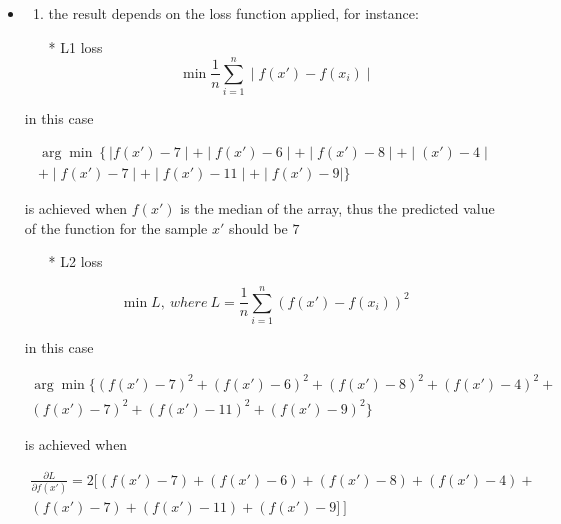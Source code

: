 \documentclass[11pt]{article}
\providecommand{\tightlist}{%
      \setlength{\itemsep}{0pt}\setlength{\parskip}{0pt}}
\begin{document}
    \begin{itemize}
\item
  \begin{enumerate}
  \def\labelenumi{(\alph{enumi})}
  \setcounter{enumi}{1}
  \tightlist
  \item
    the result depends on the loss function applied, for instance:
  \end{enumerate}

  \begin{itemize}
  \tightlist
  \item[*]
    L1 loss \[\min \frac{1}{n} \sum^n_{i=1} \mid f(x') - f(x_i) \mid\]
  \end{itemize}

  in this case

\begin{equation*}
	\begin{aligned}
		\arg \min \left \{\mid f(x') - 7 \mid + \mid f(x') - 6 \mid +\mid f(x') - 8 \mid+\mid (x') - 4 \mid \\
		+\mid f(x') - 7 \mid +\mid f(x') - 11 \mid+\mid f(x') - 9 \mid  \} 
	\end{aligned}
\end{equation*}


  is achieved when  \(f(x')\) is the median of the array, thus the predicted value of the function for the sample \(x'\) should
  be \(7\)

  \begin{itemize}
  \tightlist
  \item[*]
    L2 loss
  \end{itemize}

  \[\min L , \: where \: L = \frac{1}{n} \sum^n_{i=1} \left ( f(x') - f(x_i) \right )^2\]

  in this case

\begin{equation*}
	\begin{aligned}
	\arg \min  \{\left ( f(x') - 7\right )^2+ \left ( f(x') - 6 \right )^2+ \left ( f(x') - 8 \right )^2+ \left ( f(x') - 4 \right )^2+\\ \left ( f(x') - 7 \right )^2+ \left ( f(x') - 11 \right )^2+ \left ( f(x') -9 \right )^2 \}
	\end{aligned}
\end{equation*}

  is achieved when

 \begin{equation*}\label{eq:}
 \begin{aligned}
 \frac{\partial L}{\partial f(x')} = 2 [\left ( f(x') - 7 \right ) + \left ( f(x') - 6 \right )+ 
  \left ( f(x') - 8 \right )+ 
   \left ( f(x') - 4 \right )+ \\
    \left ( f(x') - 7\right )+ \left ( f(x') -11 \right )+ \left ( f(x') - 9 ]\right ]
  \end{aligned}
 \end{equation*}
 

\end{itemize}
\end{document}
